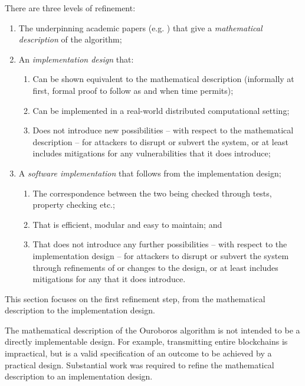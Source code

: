 \documentclass[11pt,a4paper]{article}
\begin{document}
There are three levels of refinement:

\begin{enumerate}
\item
  The underpinning academic papers (e.g. \cite{BGKR17, BGKRZ19}) that
  give a \emph{mathematical description} of the algorithm;
\item
  An \emph{implementation design} that:

  \begin{enumerate}
  \item
    Can be shown equivalent to the mathematical description (informally
    at first, formal proof to follow as and when time permits);
  \item
    Can be implemented in a real-world distributed computational
    setting;
  \item
    Does not introduce new possibilities -- with respect to the
    mathematical description -- for attackers to disrupt or subvert the
    system, or at least includes mitigations for any vulnerabilities
    that it does introduce;
  \end{enumerate}
\item
  A \emph{software implementation} that follows from the implementation
  design;

  \begin{enumerate}
  \item
    The correspondence between the two being checked through tests,
    property checking etc.;
  \item
    That is efficient, modular and easy to maintain; and
  \item
    That does not introduce any further possibilities -- with respect to
    the implementation design -- for attackers to disrupt or subvert the
    system through refinements of or changes to the design, or at least
    includes mitigations for any that it does introduce.
  \end{enumerate}
\end{enumerate}

This section focuses on the first refinement step, from the mathematical
description to the implementation design.

The mathematical description of the Ouroboros algorithm is not intended
to be a directly implementable design. For example, transmitting entire
blockchains is impractical, but is a valid specification of an outcome
to be achieved by a practical design. Substantial work was required to
refine the mathematical description to an implementation design.
\end{document}
